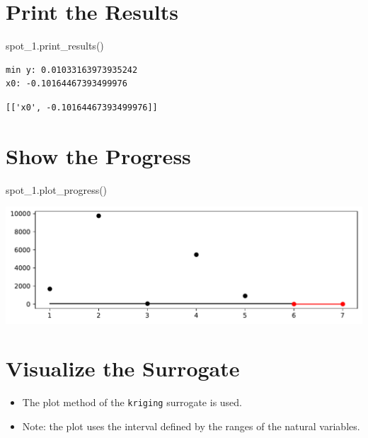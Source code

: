\documentclass[
  letterpaper,
  DIV=11,
  numbers=noendperiod]{scrreprt}
\newenvironment{Shaded}{\begin{snugshade}}{\end{snugshade}}
\newcommand{\NormalTok}[1]{\textcolor[rgb]{0.00,0.23,0.31}{#1}}
\providecommand{\tightlist}{%
  \setlength{\itemsep}{0pt}\setlength{\parskip}{0pt}}\usepackage{longtable,booktabs,array}
\begin{document}
\section{Print the Results}\label{print-the-results-5}

\begin{Shaded}
\begin{Highlighting}[]
\NormalTok{spot\_1.print\_results()}
\end{Highlighting}
\end{Shaded}

\begin{verbatim}
min y: 0.01033163973935242
x0: -0.10164467393499976
\end{verbatim}

\begin{verbatim}
[['x0', -0.10164467393499976]]
\end{verbatim}

\section{Show the Progress}\label{show-the-progress-2}

\begin{Shaded}
\begin{Highlighting}[]
\NormalTok{spot\_1.plot\_progress()}
\end{Highlighting}
\end{Shaded}

\includegraphics{a_04_spot_doc_files/figure-pdf/cell-8-output-1.pdf}

\section{Visualize the Surrogate}\label{visualize-the-surrogate}

\begin{itemize}
\tightlist
\item
  The plot method of the \texttt{kriging} surrogate is used.
\item
  Note: the plot uses the interval defined by the ranges of the natural
  variables.
\end{itemize}
\end{document}
